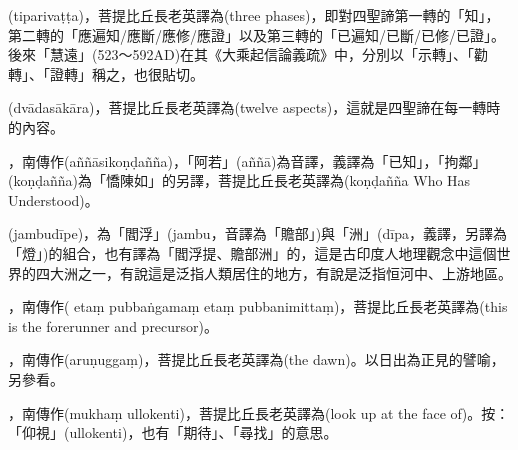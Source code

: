 \startitemgroup[noteitems]
\item{}(tiparivaṭṭa)，菩提比丘長老英譯為(three phases)，即對四聖諦第一轉的「知」，第二轉的「應遍知/應斷/應修/應證」以及第三轉的「已遍知/已斷/已修/已證」。後來「慧遠」(523～592AD)在其《大乘起信論義疏》中，分別以「示轉」、「勸轉」、「證轉」稱之，也很貼切。
\stopitemgroup

\startitemgroup[noteitems]
\item{}(dvādasākāra)，菩提比丘長老英譯為(twelve aspects)，這就是四聖諦在每一轉時的內容。
\stopitemgroup

\startitemgroup[noteitems]
\item{}，南傳作(aññāsikoṇḍañña)，「阿若」(aññā)為音譯，義譯為「已知」，「拘鄰」(koṇḍañña)為「憍陳如」的另譯，菩提比丘長老英譯為(koṇḍañña Who Has Understood)。
\stopitemgroup

\startitemgroup[noteitems]
\item{}(jambudīpe)，為「閻浮」(jambu，音譯為「贍部」)與「洲」(dīpa，義譯，另譯為「燈」)的組合，也有譯為「閻浮提、贍部洲」的，這是古印度人地理觀念中這個世界的四大洲之一，有說這是泛指人類居住的地方，有說是泛指恒河中、上游地區。
\stopitemgroup

\startitemgroup[noteitems]
\item{}，南傳作( etaṃ pubbaṅgamaṃ etaṃ pubbanimittaṃ)，菩提比丘長老英譯為(this is the forerunner and precursor)。
\stopitemgroup

\startitemgroup[noteitems]
\item{}，南傳作(aruṇuggaṃ)，菩提比丘長老英譯為(the dawn)。以日出為正見的譬喻，另參看。
\stopitemgroup

\startitemgroup[noteitems]
\item{}，南傳作(mukhaṃ ullokenti)，菩提比丘長老英譯為(look up at the face of)。按：「仰視」(ullokenti)，也有「期待」、「尋找」的意思。
\stopitemgroup

